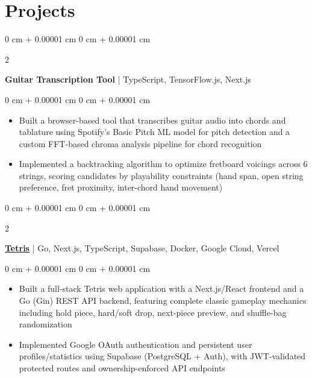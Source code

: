 \documentclass[10pt, letterpaper]{article}
\newenvironment{highlights}{
    \begin{itemize}[
        topsep=0.08 cm,
        parsep=0.08 cm,
        partopsep=0pt,
        itemsep=0pt,
        leftmargin=0 cm + 10pt
    ]
}{
    \end{itemize}
} %
\newenvironment{onecolentry}{
    \begin{adjustwidth}{
        0 cm + 0.00001 cm
    }{
        0 cm + 0.00001 cm
    }
}{
    \end{adjustwidth}
} %
\newenvironment{twocolentry}[2][]{
    \onecolentry
    \def\secondColumn{#2}
    \setcolumnwidth{\fill, 4.5 cm}
    \begin{paracol}{2}
}{
    \switchcolumn \raggedleft \secondColumn
    \end{paracol}
    \endonecolentry
} %
\begin{document}
    \section{Projects}
        
        \begin{twocolentry}{}
            \textbf{Guitar Transcription Tool} | TypeScript, TensorFlow.js, Next.js
        \end{twocolentry}
        
        \vspace{0.08 cm}
        \begin{onecolentry}
            \begin{highlights}
                \item Built a browser-based tool that transcribes guitar audio into chords and tablature using Spotify's Basic Pitch ML model for pitch detection and a custom FFT-based chroma analysis pipeline for chord recognition
                \item Implemented a backtracking algorithm to optimize fretboard voicings across 6
   strings, scoring candidates by playability constraints (hand span, open
  string preference, fret proximity, inter-chord hand movement)
            \end{highlights}
        \end{onecolentry}

        \vspace{0.25 cm}
        
        \begin{twocolentry}{}
            \href{https://tetris-vert.vercel.app/}{\textbf{Tetris}} | Go, Next.js, TypeScript, Supabase, Docker, Google Cloud, Vercel
        \end{twocolentry}
        \vspace{0.08 cm}    
        \begin{onecolentry}
            \begin{highlights}
                \item Built a full-stack Tetris web application with a Next.js/React frontend and
  a Go (Gin) REST API backend, featuring complete classic gameplay mechanics
  including hold piece, hard/soft drop, next-piece preview, and shuffle-bag
  randomization
                \item Implemented Google OAuth authentication and persistent user
  profiles/statistics using Supabase (PostgreSQL + Auth), with JWT-validated
  protected routes and ownership-enforced API endpoints
            \end{highlights}
        \end{onecolentry}

\vspace{0.05 cm}
\end{document}
